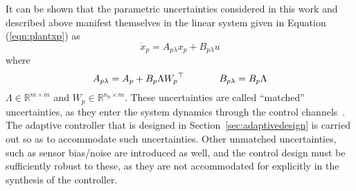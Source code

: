 It can be shown that the parametric uncertainties considered in this work and described above manifest themselves in the linear system given in Equation (\ref{eqn:plantxp}) as
\begin{equation}
  \label{eqn:xdotpunc}
  \dot{x}_{p}=A_{p\lambda}x_{p}+B_{p\lambda}u
\end{equation}
where
\begin{equation}
  \label{eqn:linearuncertainties}
  A_{p\lambda}=A_{p}+B_{p}\Lambda{W_{p}}^{\top}
  \hspace{0.5in}
  B_{p\lambda}=B_{p}\Lambda
\end{equation}
$\Lambda\in\mathbb{R}^{m\times m}$ and $W_{p}\in\mathbb{R}^{n_{p}\times m}$.
These uncertainties are called ``matched'' uncertainties, as they enter the system dynamics through the control channels\ \cite{lavretskywise.book.2013}.
The adaptive controller that is designed in Section~\ref{sec:adaptivedesign} is carried out so as to accommodate such uncertainties.
Other unmatched uncertainties, such as sensor bias/noise are introduced as well, and the control design must be sufficiently robust to these, as they are not accommodated for explicitly in the synthesis of the controller.
